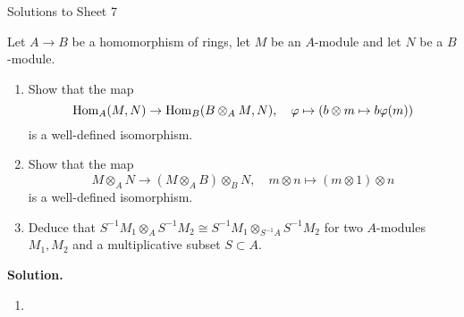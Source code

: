 \documentclass[a4paper,11pt]{article}
\begin{document}
\begin{center}
    \huge{Solutions to Sheet 7}
\end{center}

Let $A \to B$ be a homomorphism of rings, let $M$ be an $A$-module and 
let $N$ be a $B$-module. 
\begin{enumerate}
    \item Show that the map
        \begin{equation*}
            \operatorname{Hom}_A(M,N) \to \operatorname{Hom}_B(B \otimes_A M, N), \quad
            \varphi \mapsto (b \otimes m \mapsto b \varphi(m))
        \end{equation*}
        is a well-defined isomorphism.

    \item Show that the map
        \begin{equation*}
            M \otimes_A N \to (M \otimes_A B) \otimes_B N, \quad
            m \otimes n \mapsto (m \otimes 1) \otimes n
        \end{equation*}
        is a well-defined isomorphism. 

    \item Deduce that $S^{-1} M_1 \otimes_A S^{-1}M_2 \cong
        S^{-1} M_1 \otimes_{S^{-1}A} S^{-1} M_2$
        for two $A$-modules $M_1, M_2$ and a multiplicative subset 
        $S \subset A$. 
\end{enumerate}
\textbf{Solution.}
\begin{enumerate}
    \item  
\end{enumerate}
\end{document}
